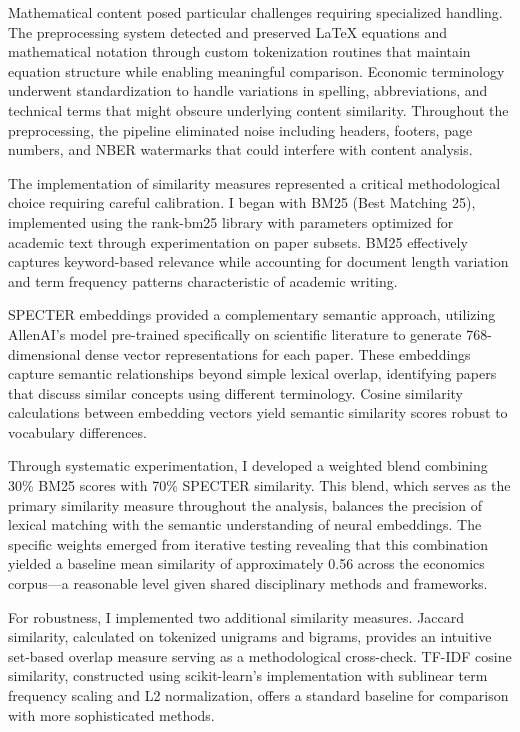 \documentclass[12pt]{article}
\begin{document}
Mathematical content posed particular challenges requiring specialized handling. The preprocessing system detected and preserved LaTeX equations and mathematical notation through custom tokenization routines that maintain equation structure while enabling meaningful comparison. Economic terminology underwent standardization to handle variations in spelling, abbreviations, and technical terms that might obscure underlying content similarity. Throughout the preprocessing, the pipeline eliminated noise including headers, footers, page numbers, and NBER watermarks that could interfere with content analysis.

The implementation of similarity measures represented a critical methodological choice requiring careful calibration. I began with BM25 (Best Matching 25), implemented using the rank-bm25 library with parameters optimized for academic text through experimentation on paper subsets. BM25 effectively captures keyword-based relevance while accounting for document length variation and term frequency patterns characteristic of academic writing. 

SPECTER embeddings provided a complementary semantic approach, utilizing AllenAI's model pre-trained specifically on scientific literature to generate 768-dimensional dense vector representations for each paper. These embeddings capture semantic relationships beyond simple lexical overlap, identifying papers that discuss similar concepts using different terminology. Cosine similarity calculations between embedding vectors yield semantic similarity scores robust to vocabulary differences.

Through systematic experimentation, I developed a weighted blend combining 30\% BM25 scores with 70\% SPECTER similarity. This blend, which serves as the primary similarity measure throughout the analysis, balances the precision of lexical matching with the semantic understanding of neural embeddings. The specific weights emerged from iterative testing revealing that this combination yielded a baseline mean similarity of approximately 0.56 across the economics corpus—a reasonable level given shared disciplinary methods and frameworks.

For robustness, I implemented two additional similarity measures. Jaccard similarity, calculated on tokenized unigrams and bigrams, provides an intuitive set-based overlap measure serving as a methodological cross-check. TF-IDF cosine similarity, constructed using scikit-learn's implementation with sublinear term frequency scaling and L2 normalization, offers a standard baseline for comparison with more sophisticated methods.
\end{document}
